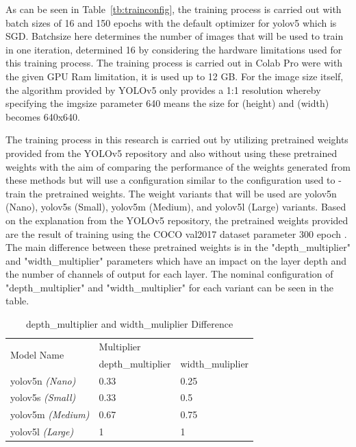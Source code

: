 \par As can be seen in Table~\ref{tb:trainconfig}, the training process is carried out with batch sizes of 16 and 150 epochs with the default optimizer for yolov5 which is SGD. Batch\textunderscore size here determines the number of images that will be used to train in one iteration, determined 16 by considering the hardware limitations used for this training process. The training process is carried out in Colab Pro were with the given GPU Ram limitation, it is used up to 12 GB. For the image size itself, the algorithm provided by YOLOv5 only provides a 1:1 resolution whereby specifying the imgsize parameter 640 means the size for (height) and (width) becomes 640x640.

\par The training process in this research is carried out by utilizing pretrained weights provided from the YOLOv5 repository and also without using these pretrained weights with the aim of comparing the performance of the weights generated from these methods but will use a configuration similar to the configuration used to -train the pretrained weights. The weight variants that will be used are yolov5n (Nano), yolov5s (Small), yolov5m (Medium), and yolov5l (Large) variants. Based on the explanation from the YOLOv5 repository, the pretrained weights provided are the result of training using the COCO val2017 dataset parameter 300 epoch \cite{glenn_jocher_yolov5}. The main difference between these pretrained weights is in the "depth\_multiplier" and "width\_multiplier" parameters which have an impact on the layer depth and the number of channels of output for each layer. The nominal configuration of "depth\_multiplier" and "width\_multiplier" for each variant can be seen in the table.

\begin{table} [ht]
  \caption{depth\_multiplier and width\_muliplier Difference}
  \label{tb:pretrainedparamdiff}
  \centering
  \begin{tabular}{|l|l|l|}
    \hline
    \multirow{2}{*}{Model Name} & \multicolumn{2}{l|}{Multiplier}      \\ 
    \cline{2-3}
                                 & depth\_multiplier & width\_muliplier  \\ 
    \hline
    yolov5n\textit{ (Nano)}      & 0.33              & 0.25              \\
    yolov5s\textit{ (Small)}     & 0.33              & 0.5               \\
    yolov5m\textit{ (Medium)}    & 0.67              & 0.75              \\
    yolov5l\textit{ (Large)}     & 1                 & 1                 \\
    \hline
  \end{tabular}
\end{table}

